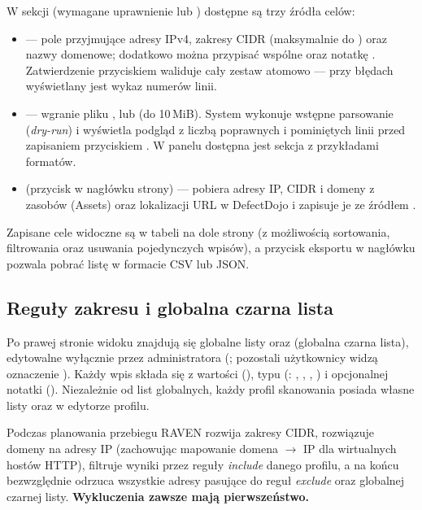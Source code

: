 \documentclass[10pt,a4paper]{article}
\begin{document}
W sekcji  (wymagane uprawnienie  lub ) dostępne są trzy źródła celów:
\begin{itemize}
  \item {} --- pole  przyjmujące adresy IPv4, zakresy CIDR (maksymalnie do ) oraz nazwy domenowe; dodatkowo można przypisać wspólne  oraz notatkę . Zatwierdzenie przyciskiem  waliduje cały zestaw atomowo --- przy błędach wyświetlany jest wykaz numerów linii.
  \item {} --- wgranie pliku ,  lub  (do 10\,MiB). System wykonuje wstępne parsowanie (\emph{dry-run}) i wyświetla podgląd  z liczbą poprawnych i pominiętych linii przed zapisaniem przyciskiem . W panelu dostępna jest sekcja  z przykładami formatów.
  \item {} (przycisk w nagłówku strony) --- pobiera adresy IP, CIDR i domeny z zasobów (Assets) oraz lokalizacji URL w DefectDojo i zapisuje je ze źródłem .
\end{itemize}

Zapisane cele widoczne są w tabeli na dole strony (z możliwością sortowania, filtrowania oraz usuwania pojedynczych wpisów), a przycisk eksportu w nagłówku pozwala pobrać listę w formacie CSV lub JSON.

\subsection{Reguły zakresu i globalna czarna lista}

Po prawej stronie widoku  znajdują się globalne listy  oraz  (globalna czarna lista), edytowalne wyłącznie przez administratora (; pozostali użytkownicy widzą oznaczenie ). Każdy wpis składa się z wartości (), typu (: , , , ) i opcjonalnej notatki (). Niezależnie od list globalnych, każdy profil skanowania posiada własne listy  oraz  w edytorze profilu.

Podczas planowania przebiegu RAVEN rozwija zakresy CIDR, rozwiązuje domeny na adresy IP (zachowując mapowanie domena $\rightarrow$ IP dla wirtualnych hostów HTTP), filtruje wyniki przez reguły \emph{include} danego profilu, a na końcu bezwzględnie odrzuca wszystkie adresy pasujące do reguł \emph{exclude} oraz globalnej czarnej listy. \textbf{Wykluczenia zawsze mają pierwszeństwo.}
\end{document}
